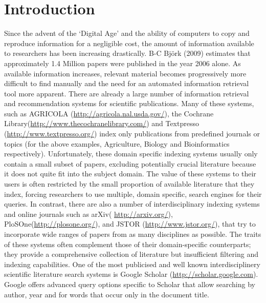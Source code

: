 \documentclass{svmult}
\begin{document}
\section{Introduction}
\label{sec:1}
Since the advent of the `Digital Age' and the ability of computers to copy and reproduce information for a negligible cost, the amount of information available to researchers has been increasing drastically.  B-C Bj\"{o}rk (2009) estimates that approximately 1.4 Million papers were published in the year 2006 alone\cite{bjork2009}.
As available information increases, relevant material becomes progressively more difficult to find manually and the need for an automated information retrieval tool more apparent.
There are already a large number of information retrieval and recommendation systems for scientific publications.  Many of these systems, such as AGRICOLA (\url{http://agricola.nal.usda.gov/}), the Cochrane Library(\url{http://www.thecochranelibrary.com/}) and Textpresso (\url{http://www.textpresso.org/}) index only publications from predefined journals or topics (for the above examples, Agriculture, Biology and Bioinformatics respectively).
Unfortunately, these domain specific indexing systems usually only contain a small subset of papers, excluding potentially crucial literature because it does not quite fit into the subject domain. 
The value of these systems to their users is often restricted by the small proportion of available literature that they index, forcing researchers to use multiple, domain specific, search engines for their queries.
In contrast, there are also a number of interdisciplinary indexing systems and online journals such as arXiv( \url{http://arxiv.org/}), PloSOne(\url{http://plosone.org/}), and JSTOR (\url{http://www.jstor.org/}), that try to incorporate wide ranges of papers from as many disciplines as possible. The traits of these systems often complement those of their domain-specific counterparts; they provide a comprehensive collection of literature but insufficient filtering and indexing capabilities.
One of the most publicised and well known interdisciplinery scientific literature search systems is Google Scholar (\url{http://scholar.google.com}). Google offers advanced query options specific to Scholar that allow searching by author, year and for words that occur only in the document title.
\end{document}
